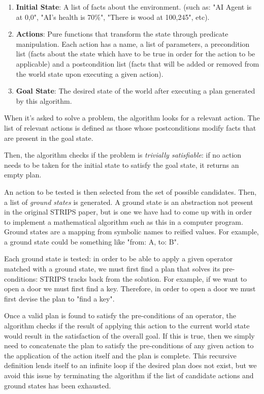 \documentclass[a4paper]{report}
\begin{document}
\begin{enumerate}
    \item \textbf{Initial State}: A list of facts about the environment. (such as: "AI Agent is at 0,0", "AI's health is 70\%", "There is wood at 100,245", etc).
    \item \textbf{Actions}: Pure functions that transform the state through predicate manipulation. Each action has a name, a list of parameters, a precondition list (facts about the state which have to be true in order for the action to be applicable) and a postcondition list (facts that will be added or removed from the world state upon executing a given action).
    \item \textbf{Goal State}: The desired state of the world after executing a plan generated by this algorithm.
\end{enumerate}

When it's asked to solve a problem, the algorithm looks for a relevant action. The list of relevant actions is defined as those whose postconditions modify facts that are present in the goal state. 

Then, the algorithm checks if the problem is \emph{trivially satisfiable}: if no action needs to be taken for the initial state to satisfy the goal state, it returns an empty plan.

An action to be tested is then selected from the set of possible candidates. Then, a list of \emph{ground states} is generated. A ground state is an abstraction not present in the original STRIPS paper, but is one we have had to come up with in order to implement a mathematical algorithm such as this in a computer program. Ground states are a mapping from symbolic names to reified values. For example, a ground state could be something like "from: A, to: B".

Each ground state is tested: in order to be able to apply a given operator matched with a ground state, we must first find a plan that solves its pre-conditions: STRIPS tracks back from the solution. For example, if we want to open a door we must first find a key. Therefore, in order to open a door we must first devise the plan to "find a key".

Once a valid plan is found to satisfy the pre-conditions of an operator, the algorithm checks if the result of applying this action to the current world state would result in the satisfaction of the overall goal. If this is true, then we simply need to concatenate the plan to satisfy the pre-conditions of any given action to the application of the action itself and the plan is complete. This recursive definition lends itself to an infinite loop if the desired plan does not exist, but we avoid this issue by terminating the algorithm if the list of candidate actions and ground states has been exhausted. 
\end{document}
